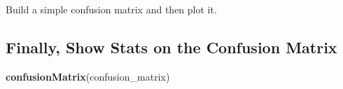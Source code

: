 \documentclass[]{article}
\newenvironment{Shaded}{\begin{snugshade}}{\end{snugshade}}
\newcommand{\CommentTok}[1]{\textcolor[rgb]{0.56,0.35,0.01}{\textit{#1}}}
\newcommand{\KeywordTok}[1]{\textcolor[rgb]{0.13,0.29,0.53}{\textbf{#1}}}
\newcommand{\NormalTok}[1]{#1}
\newcommand{\OperatorTok}[1]{\textcolor[rgb]{0.81,0.36,0.00}{\textbf{#1}}}
\newcommand{\StringTok}[1]{\textcolor[rgb]{0.31,0.60,0.02}{#1}}
\begin{document}
Build a simple confusion matrix and then plot it.

\begin{Shaded}
\end{Shaded}

\hypertarget{finally-show-stats-on-the-confusion-matrix}{%
\subsection{Finally, Show Stats on the Confusion
Matrix}\label{finally-show-stats-on-the-confusion-matrix}}

\begin{Shaded}
\begin{Highlighting}[]
\KeywordTok{confusionMatrix}\NormalTok{(confusion_matrix)}
\end{Highlighting}
\end{Shaded}
\end{document}
